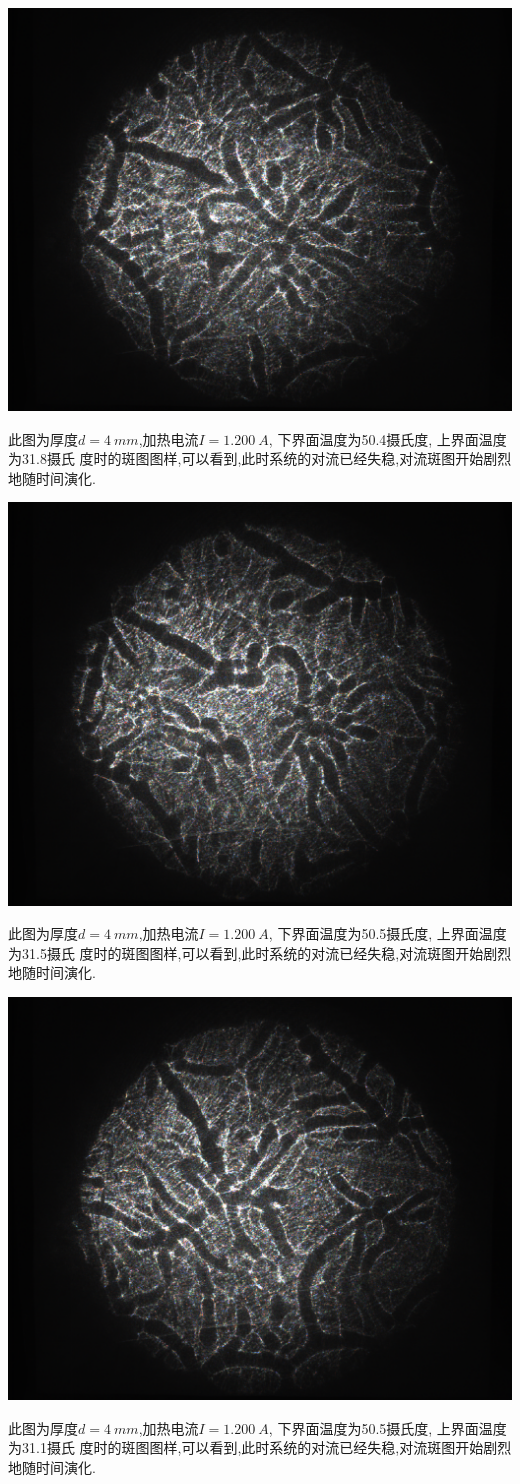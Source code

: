 \documentclass[aps,pre,12pt,preprint,onecolumn,showpacs,showkeys,floatfix]{revtex4-1}
\begin{document}
\begin{center}
    \includegraphics[width=.5\textwidth]{5.20/18.pdf}
\end{center}
    此图为厚度$d=\SI{4}{mm}$,加热电流$I=\SI{1.200}{A}$, 下界面温度为50.4摄氏度,
    上界面温度为31.8摄氏
    度时的斑图图样,可以看到,此时系统的对流已经失稳,对流斑图开始剧烈地随时间演化.

\begin{center}
    \includegraphics[width=.5\textwidth]{5.20/19.pdf}
\end{center}
    此图为厚度$d=\SI{4}{mm}$,加热电流$I=\SI{1.200}{A}$, 下界面温度为50.5摄氏度,
    上界面温度为31.5摄氏
    度时的斑图图样,可以看到,此时系统的对流已经失稳,对流斑图开始剧烈地随时间演化.

\begin{center}
    \includegraphics[width=.5\textwidth]{5.20/20.pdf}
\end{center}
    此图为厚度$d=\SI{4}{mm}$,加热电流$I=\SI{1.200}{A}$, 下界面温度为50.5摄氏度,
    上界面温度为31.1摄氏
    度时的斑图图样,可以看到,此时系统的对流已经失稳,对流斑图开始剧烈地随时间演化.
\end{document}
